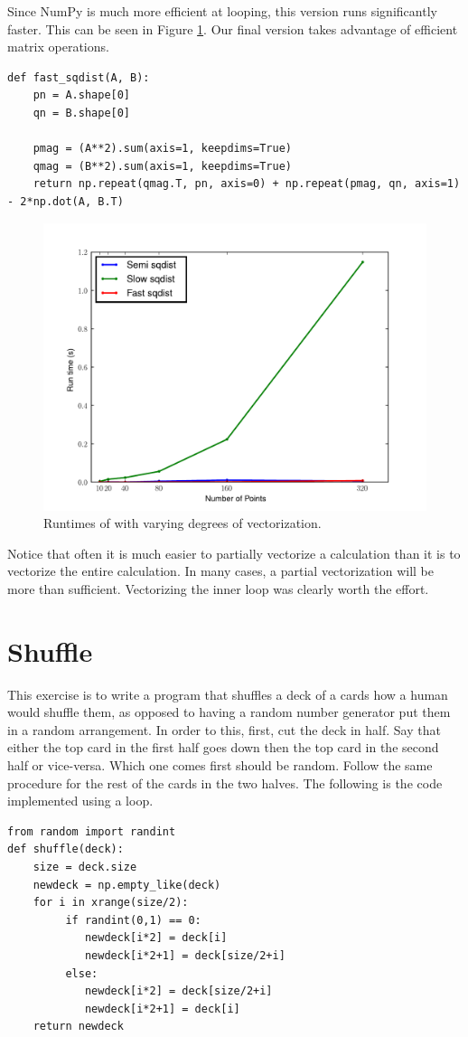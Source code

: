 Since NumPy is much more efficient at looping, this version runs significantly faster.  This can be seen in Figure \ref{fig:sqplot}.
Our final version takes advantage of efficient matrix operations.
\begin{lstlisting}
def fast_sqdist(A, B):
    pn = A.shape[0]
    qn = B.shape[0]
    
    pmag = (A**2).sum(axis=1, keepdims=True)
    qmag = (B**2).sum(axis=1, keepdims=True)
    return np.repeat(qmag.T, pn, axis=0) + np.repeat(pmag, qn, axis=1) - 2*np.dot(A, B.T)
\end{lstlisting}

\begin{figure}[h]
\centering
\includegraphics[width=\textwidth]{sqplot.pdf}
\caption{Runtimes of  with varying degrees of vectorization.}
\label{fig:sqplot}
\end{figure}

Notice that often it is much easier to partially vectorize a calculation than it is to vectorize the entire calculation.
In many cases, a partial vectorization will be more than sufficient.  Vectorizing the inner loop was clearly worth the effort.

\section*{Shuffle}
This exercise is to write a program that shuffles a deck of a cards how a human would shuffle them, as opposed to having a random number generator put them in a random arrangement. 
In order to this, first, cut the deck in half. 
Say that either the top card in the first half goes down then the top card in the second half or vice-versa.
Which one comes first should be random.
Follow the same procedure for the rest of the cards in the two halves. 
The following is the code implemented using a loop.
\begin{lstlisting}
from random import randint
def shuffle(deck):
    size = deck.size
    newdeck = np.empty_like(deck)
    for i in xrange(size/2):
         if randint(0,1) == 0:
            newdeck[i*2] = deck[i]
            newdeck[i*2+1] = deck[size/2+i]
         else:
            newdeck[i*2] = deck[size/2+i]
            newdeck[i*2+1] = deck[i]
    return newdeck
\end{lstlisting}

